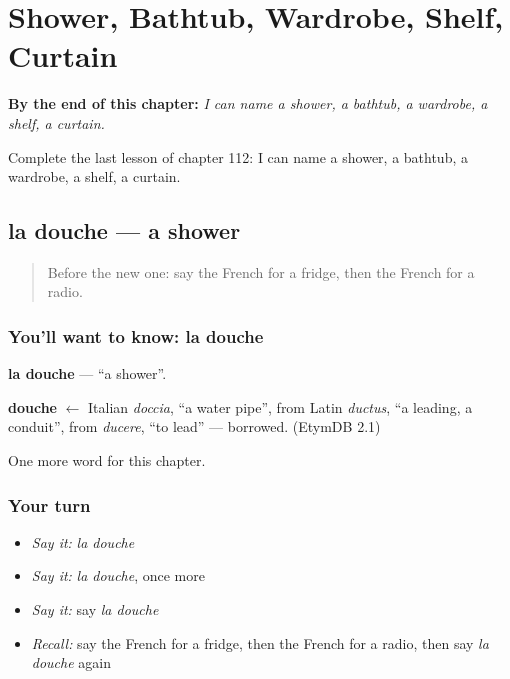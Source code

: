 
\chapter{Shower, Bathtub, Wardrobe, Shelf, Curtain}
\label{ch:fr-shower-bathtub-wardrobe-shelf-curtain}

\begin{chapteropening}
\textbf{By the end of this chapter:} \emph{I can name a shower, a bathtub, a wardrobe, a shelf, a curtain.}

Complete the last lesson of chapter 112: I can name a shower, a bathtub, a wardrobe, a shelf, a curtain.
\end{chapteropening}

\section[la douche]{la douche — a shower}

\label{lesson:FR-C112-douche}



\begin{quote}
Before the new one: say the French for a fridge, then the French for a radio.
\end{quote}

\subsection*{You'll want to know: la douche}
\textbf{la douche} — \textquotedblleft{}a shower\textquotedblright{}.

\begin{cousinweb}
\textbf{douche} $\leftarrow$ Italian \emph{doccia}, \textquotedblleft{}a water pipe\textquotedblright{}, from Latin \emph{ductus}, \textquotedblleft{}a leading, a conduit\textquotedblright{}, from \emph{ducere}, \textquotedblleft{}to lead\textquotedblright{} — borrowed. (EtymDB 2.1)
\end{cousinweb}

\begin{grammarlens}[title={What you've built}]
One more word for this chapter.
\end{grammarlens}

\subsection*{Your turn}
\begin{itemize}
\raggedright
  \item \emph{Say it:} \emph{la douche}
  \item \emph{Say it:} \emph{la douche}, once more
  \item \emph{Say it:} say \emph{la douche}
  \item \emph{Recall:} say the French for a fridge, then the French for a radio, then say \emph{la douche} again
\end{itemize}

